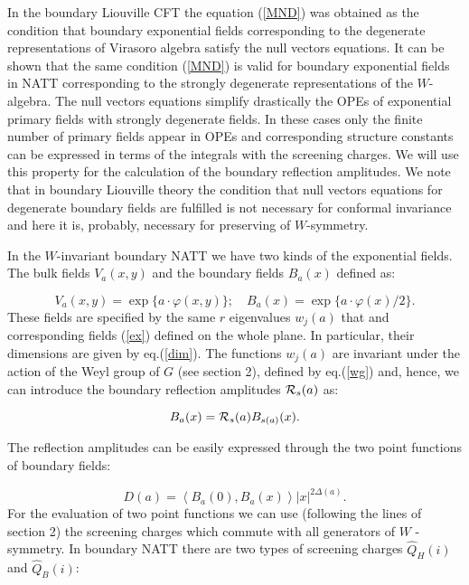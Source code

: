 \documentclass[a4paper,12pt]{article}
\begin{document}
In the
boundary Liouville CFT \cite{FZZA} the equation (\ref{MND}) was obtained as
the condition that boundary exponential fields corresponding to the
degenerate representations of Virasoro algebra satisfy the null vectors
equations. It can be shown that the same condition (\ref{MND}) is valid for
boundary exponential fields in NATT corresponding to the strongly degenerate
representations of the $W$-algebra. The null vectors equations simplify
drastically the OPEs of exponential primary fields with strongly degenerate 
fields. In these cases only the finite number of primary fields appear in OPEs 
and corresponding structure constants can be expressed in terms of the 
integrals with the screening charges. We will use this
property for the calculation of the boundary reflection amplitudes. We note
that in boundary Liouville theory the condition that null vectors equations 
for degenerate boundary fields are fulfilled is not necessary for conformal 
invariance and here it is, 
probably, necessary for preserving of $W$-symmetry.

In the $W$-invariant boundary NATT we have 
two kinds of the exponential fields. The
bulk fields $V_a(x,y)$ and the boundary fields $B_a(x)$ defined as:

\begin{equation}
V_a(x,y)=\exp \{a\cdot \varphi (x,y)\};\quad B_a(x)=\exp \{a\cdot \varphi
(x)/2\}.  \label{VA}
\end{equation}
These fields are specified by the same $r$ eigenvalues $w_j(a)$ that and
corresponding fields (\ref{ex}) defined on the whole plane. In particular,
their dimensions are given by eq.(\ref{dim}). The functions $w_j(a)$ are
invariant under the action of the Weyl group of $G$ (see section 2), defined
by eq.(\ref{wg}) and, hence, we can introduce the boundary reflection
amplitudes ${\cal R}_s(a)$ as:

\begin{equation}
B_a(x)={\cal R}_s(a)B_{s(a)}(x).  \label{R}
\end{equation}

The reflection amplitudes can be easily expressed through the two point
functions of boundary fields:

\begin{equation}
D(a)=\left\langle B_a(0),B_a(x)\right\rangle |x|^{2\Delta (a)}.  \label{D}
\end{equation}
For the evaluation of two point functions we can use (following the lines of
section 2) the screening charges which commute with all generators of $W$
-symmetry. In boundary NATT there are two types of screening charges 
$\widehat{Q}_H(i)$ and $\widehat{Q}_B(i)$:
\end{document}
